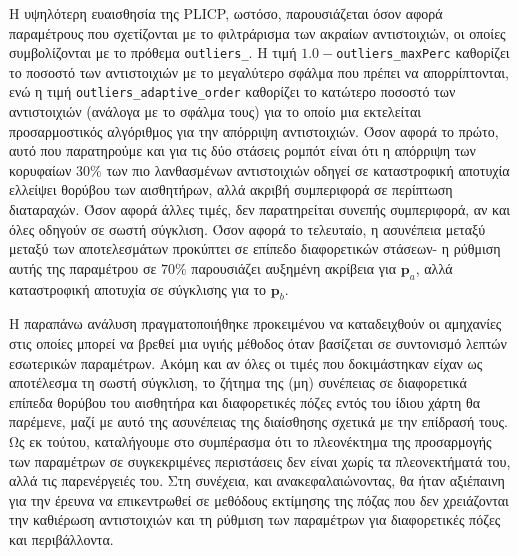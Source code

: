 Η υψηλότερη ευαισθησία της PLICP, ωστόσο, παρουσιάζεται όσον αφορά
παραμέτρους που σχετίζονται με το φιλτράρισμα των ακραίων αντιστοιχιών, οι οποίες συμβολίζονται με το
πρόθεμα \texttt{outliers\_}. Η τιμή $1.0-$\texttt{outliers\_maxPerc}
καθορίζει το ποσοστό των αντιστοιχιών με το μεγαλύτερο σφάλμα που πρέπει να
απορρίπτονται, ενώ η τιμή \texttt{outliers\_adaptive\_order} καθορίζει το
κατώτερο ποσοστό των αντιστοιχιών (ανάλογα με το σφάλμα τους) για το οποίο μια
εκτελείται προσαρμοστικός αλγόριθμος για την απόρριψη αντιστοιχιών. Όσον αφορά το
πρώτο, αυτό που παρατηρούμε και για τις δύο στάσεις ρομπότ είναι ότι η απόρριψη των κορυφαίων $30\%$
των πιο λανθασμένων αντιστοιχιών οδηγεί σε καταστροφική αποτυχία ελλείψει
θορύβου των αισθητήρων, αλλά ακριβή συμπεριφορά σε περίπτωση διαταραχών. Όσον αφορά
άλλες τιμές, δεν παρατηρείται συνεπής συμπεριφορά, αν και όλες οδηγούν σε
σωστή σύγκλιση. Όσον αφορά το τελευταίο, η ασυνέπεια μεταξύ
μεταξύ των αποτελεσμάτων προκύπτει σε επίπεδο διαφορετικών στάσεων- η ρύθμιση αυτής της παραμέτρου σε
$70\%$ παρουσιάζει αυξημένη ακρίβεια για $\bm{p}_a$, αλλά καταστροφική αποτυχία σε
σύγκλισης για το $\bm{p}_b$.

Η παραπάνω ανάλυση πραγματοποιήθηκε προκειμένου να καταδειχθούν οι αμηχανίες
στις οποίες μπορεί να βρεθεί μια υγιής μέθοδος όταν βασίζεται σε συντονισμό λεπτών
εσωτερικών παραμέτρων. Ακόμη και αν όλες οι τιμές που δοκιμάστηκαν είχαν ως αποτέλεσμα τη σωστή σύγκλιση,
το ζήτημα της (μη) συνέπειας σε διαφορετικά επίπεδα θορύβου του αισθητήρα και διαφορετικές
πόζες εντός του ίδιου χάρτη θα παρέμενε, μαζί με αυτό της ασυνέπειας
της διαίσθησης σχετικά με την επίδρασή τους. Ως εκ τούτου, καταλήγουμε στο συμπέρασμα ότι το πλεονέκτημα της
προσαρμογής των παραμέτρων σε συγκεκριμένες περιστάσεις δεν είναι χωρίς τα πλεονεκτήματά του, αλλά
τις παρενέργειές του. Στη συνέχεια, και ανακεφαλαιώνοντας, θα ήταν
αξιέπαινη για την έρευνα να επικεντρωθεί σε μεθόδους εκτίμησης της πόζας που δεν χρειάζονται
την καθιέρωση αντιστοιχιών και τη ρύθμιση των παραμέτρων για διαφορετικές πόζες
και περιβάλλοντα.



